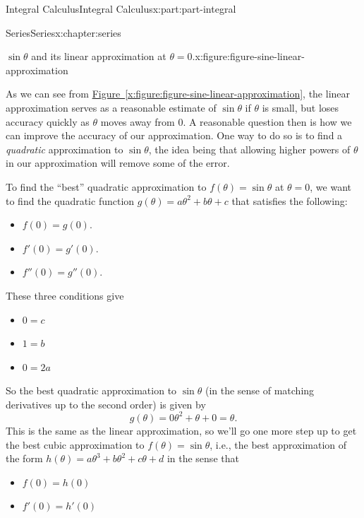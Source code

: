 \documentclass[twoside,10pt,]{tufte-book}
\newcommand{\xreffont}{\relax}
\numberwithin{equation}{part}
\begin{document}
\begin{partptx}{Integral Calculus}{}{Integral Calculus}{}{}{x:part:part-integral}
\begin{chapterptx}{Series}{}{Series}{}{}{x:chapter:series}
\begin{introduction}{}
\begin{figureptx}{\(\sin\theta\) and its linear approximation at \(\theta=0\).}{x:figure:figure-sine-linear-approximation}{}
\begin{image}{0}{1}{0}
{
}%
\end{image}%
\tcblower
\end{figureptx}%
As we can see from \hyperref[x:figure:figure-sine-linear-approximation]{Figure~{\xreffont\ref{x:figure:figure-sine-linear-approximation}}}, the linear approximation serves as a reasonable estimate of \(\sin\theta\) if \(\theta\) is small, but loses accuracy quickly as \(\theta\) moves away from \(0\). A reasonable question then is how we can improve the accuracy of our approximation. One way to do so is to find a \emph{quadratic} approximation to \(\sin\theta\), the idea being that allowing higher powers of \(\theta\) in our approximation will remove some of the error.%
\par
To find the ``best'' quadratic approximation to \(f(\theta) = \sin\theta\) at \(\theta = 0\), we want to find the quadratic function \(g(\theta) = a\theta^{2} + b\theta + c\) that satisfies the following:%
%
\begin{itemize}[label=\textbullet]
\item{}\(\displaystyle f(0) = g(0).\)%
\item{}\(\displaystyle f'(0) = g'(0).\)%
\item{}\(\displaystyle f''(0) = g''(0).\)%
\end{itemize}
These three conditions give%
%
\begin{itemize}[label=\textbullet]
\item{}\(\displaystyle 0 = c\)%
\item{}\(\displaystyle 1 = b\)%
\item{}\(\displaystyle 0 = 2a\)%
\end{itemize}
So the best quadratic approximation to \(\sin\theta\) (in the sense of matching derivatives up to the second order) is given by%
\begin{equation*}
g(\theta) = 0\theta^{2} + \theta + 0 = \theta.
\end{equation*}
This is the same as the linear approximation, so we'll go one more step up to get the best cubic approximation to \(f(\theta) = \sin\theta\), i.e.\@, the best approximation of the form \(h(\theta) = a\theta^{3} + b\theta^{2} + c\theta + d\) in the sense that%
%
\begin{itemize}[label=\textbullet]
\item{}\(\displaystyle f(0) = h(0)\)%
\item{}\(\displaystyle f'(0) = h'(0)\)%

\end{itemize}
\end{introduction}
\end{chapterptx}
\end{partptx}
\end{document}
